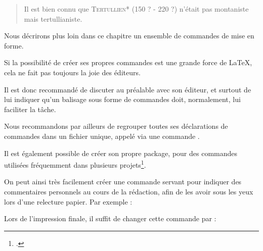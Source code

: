 \begin{latexcode}
\newcommand{\auteur}[2]{\textsc{#1}* (#2)}
\end{latexcode}

\renewcommand{\auteur}[2]{\textsc{#1}* (#2)}

\begin{quotation}
Il est bien connu que \auteur{Tertullien}{150 ? - 220 ?}
n'était pas montaniste mais tertullianiste.
\end{quotation}

Nous décrirons plus loin dans ce chapitre un ensemble de commandes de mise en forme.

\begin{attention}
    Si la possibilité de créer ses propres commandes est une grande force de \LaTeX, cela ne fait pas toujours la joie des éditeurs. 
    
    Il est donc recommandé de discuter au préalable avec son éditeur, et surtout de lui indiquer qu'un balisage sous forme de commandes doit, normalement, lui faciliter la tâche.
    
    
    Nous recommandons par ailleurs de regrouper toutes ses déclarations de commandes dans un fichier unique, appelé via une commande .
    
    Il est également possible de créer son propre package, pour des commandes utilisées fréquemment dans plusieurs projets\footcite[Ceci dépasserait le cadre de cet ouvrage : je renvoie à d'autres documents. Par exemples][]{creer_sty}.
\end{attention}


\begin{plusloins}\label{commentaireredac}
On peut ainsi très facilement créer une commande  servant pour indiquer des commentaires personnels au cours de la rédaction, afin de les avoir sous les yeux lors d'une relecture papier.
Par exemple :

\begin{latexcode}
\newcommand{\commentaire}[1]{\marginpar{#1}}
\end{latexcode}

Lors de l'impression finale, il suffit de changer cette commande par :

\begin{latexcode}
\newcommand{\commentaire}[1]{}
\end{latexcode}

\end{plusloins}

